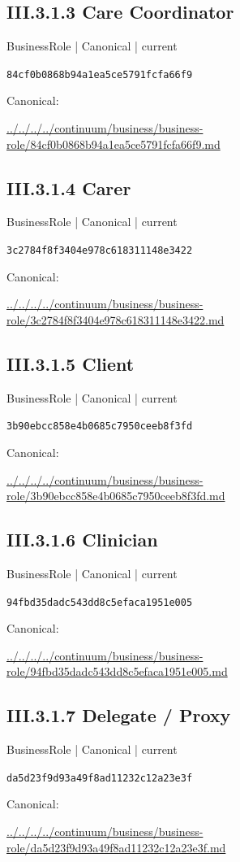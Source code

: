 \documentclass[10pt,a4paper]{article}
\begin{document}
\subsection*{III.3.1.3 Care Coordinator}
{\small BusinessRole | Canonical | current}\par
\texttt{84cf0b0868b94a1ea5ce5791fcfa66f9}\par
Canonical: \par
{\footnotesize\url{../../../../continuum/business/business-role/84cf0b0868b94a1ea5ce5791fcfa66f9.md}}\par
\subsection*{III.3.1.4 Carer}
{\small BusinessRole | Canonical | current}\par
\texttt{3c2784f8f3404e978c618311148e3422}\par
Canonical: \par
{\footnotesize\url{../../../../continuum/business/business-role/3c2784f8f3404e978c618311148e3422.md}}\par
\subsection*{III.3.1.5 Client}
{\small BusinessRole | Canonical | current}\par
\texttt{3b90ebcc858e4b0685c7950ceeb8f3fd}\par
Canonical: \par
{\footnotesize\url{../../../../continuum/business/business-role/3b90ebcc858e4b0685c7950ceeb8f3fd.md}}\par
\subsection*{III.3.1.6 Clinician}
{\small BusinessRole | Canonical | current}\par
\texttt{94fbd35dadc543dd8c5efaca1951e005}\par
Canonical: \par
{\footnotesize\url{../../../../continuum/business/business-role/94fbd35dadc543dd8c5efaca1951e005.md}}\par
\subsection*{III.3.1.7 Delegate / Proxy}
{\small BusinessRole | Canonical | current}\par
\texttt{da5d23f9d93a49f8ad11232c12a23e3f}\par
Canonical: \par
{\footnotesize\url{../../../../continuum/business/business-role/da5d23f9d93a49f8ad11232c12a23e3f.md}}\par
\end{document}
